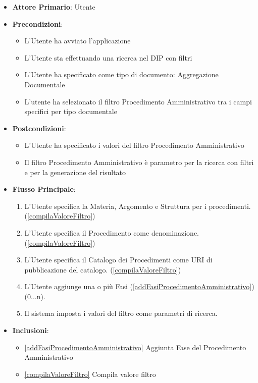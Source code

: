 \begin{itemize}
      \item \textbf{Attore Primario}: Utente
      \item \textbf{Precondizioni}: 
      \begin{itemize}
            \item L'Utente ha avviato l'applicazione
            \item L'Utente sta effettuando una ricerca nel DIP con filtri
            \item L'Utente ha specificato come tipo di documento: Aggregazione Documentale
            \item L'utente ha selezionato il filtro Procedimento Amministrativo tra i campi specifici per tipo documentale
      \end{itemize}
      \item \textbf{Postcondizioni}: 
      \begin{itemize}
            \item L'Utente ha specificato i valori del filtro Procedimento Amministrativo
            \item Il filtro Procedimento Amministrativo è parametro per la ricerca con filtri e per la generazione del risultato
      \end{itemize}
      \item \textbf{Flusso Principale}:
      \begin{enumerate}
            \item L'Utente specifica la Materia, Argomento e Struttura per i procedimenti. (\ref{compilaValoreFiltro})
            \item L'Utente specifica il Procedimento come denominazione. (\ref{compilaValoreFiltro})
            \item L'Utente specifica il Catalogo dei Procedimenti come URI di pubblicazione del catalogo. (\ref{compilaValoreFiltro})
            \item L'Utente aggiunge una o più Fasi (\ref{addFasiProcedimentoAmministrativo})(0...n).
            \item Il sistema imposta i valori del filtro come parametri di ricerca.
      \end{enumerate}
      \item \textbf{Inclusioni}: 
      \begin{itemize}
            \item \ref{addFasiProcedimentoAmministrativo} Aggiunta Fase del Procedimento Amministrativo
            \item \ref{compilaValoreFiltro} Compila valore filtro
      \end{itemize}
\end{itemize}
      
